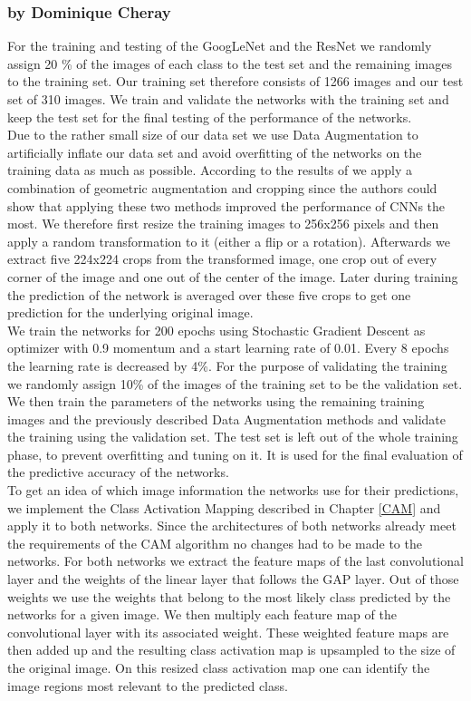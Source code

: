\documentclass[11pt]{report}
\begin{document}
\subsubsection{by Dominique Cheray}
For the training and testing of the GoogLeNet and the ResNet we randomly
assign 20 \% of the images of each class to the test set and the remaining
images to the training set. Our training set therefore consists of 1266 images
and our test set of 310 images. We train and validate the networks with the
training set and keep the test set for the final testing of the performance
of the networks. \\
Due to the rather small size of our data set we use Data Augmentation to
artificially inflate our data set and avoid overfitting of the networks on the
training data as much as possible. According to the results of \cite{taylor2017improving} we apply
a combination of geometric augmentation and cropping since the authors could
show that applying these two methods improved the performance of CNNs
the most. We therefore first resize the training images to 256x256 pixels and
then apply a random transformation to it (either a flip or a rotation).
Afterwards we extract five 224x224 crops from the transformed image, one crop
out of every corner of the image and one out of the center of the image. Later
during training the prediction of the network is averaged over these five crops
to get one prediction for the underlying original image. \\
We train the networks for 200 epochs using Stochastic Gradient Descent as
optimizer with 0.9 momentum and a start learning rate of 0.01. Every 8 epochs
the learning rate is decreased by 4\%. For the purpose of validating the
training we randomly assign 10\% of the images of the training set to be the validation
set. We then train the parameters of the networks using the remaining training
images and the previously described Data Augmentation methods and validate the
training using the validation set. The test set is left out of the whole
training phase, to prevent overfitting and tuning on it. It is used for the
final evaluation of the predictive accuracy of the networks. \\
To get an idea of which image information the networks use for their
predictions, we implement the Class Activation Mapping described in Chapter
\ref{CAM} and apply it to both networks. Since the architectures of both
networks already 
meet the requirements of the CAM algorithm no changes had to be made to the
networks. For both networks we extract the feature maps of the last
convolutional layer and the weights of the linear layer that follows the GAP
layer. Out of those weights we use the weights that belong to the most
likely class predicted by the networks for a given image. We then multiply each
feature map of the convolutional layer with its associated weight. These
weighted feature maps are then added up and the resulting class activation map
is upsampled to the size of the original image. On this resized class activation
map one can identify the image regions most relevant to the predicted class.  
\end{document}
